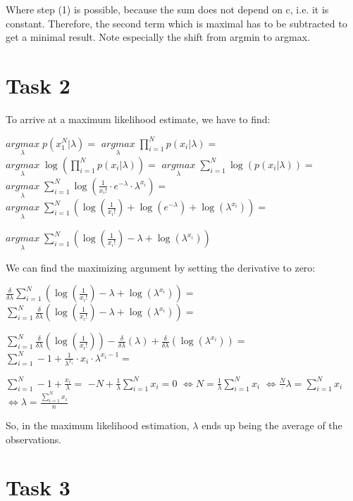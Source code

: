 \documentclass[%
   11pt,              %
   ngerman,           %
   a4paper,           %
   DIV11,             %
]{scrartcl}%
\begin{document}
Where step (1) is possible, because the sum does not depend on c, i.e. it is constant. Therefore, the second term which is maximal has to be subtracted to get a minimal result. Note especially the shift from argmin to argmax.
\
\section*{Task 2}

To arrive at a maximum likelihood estimate, we have to find:

$\underset{\lambda}{arg max}\; p(x_1^N|\lambda) = $
$\underset{\lambda}{arg max}\;  \displaystyle\prod_{i= 1}^N p(x_i|\lambda) = $
$\underset{\lambda}{arg max}\;  \log(\displaystyle\prod_{i= 1}^N p(x_i|\lambda)) = $
$\underset{\lambda}{arg max}\;  \displaystyle\sum_{i= 1}^N \log(p(x_i|\lambda)) = $
$\underset{\lambda}{arg max}\;  \displaystyle\sum_{i= 1}^N \log(\frac{1}{x_i!}\cdot e^{-\lambda}\cdot \lambda^{x_i} ) = $
$\underset{\lambda}{arg max}\;  \displaystyle\sum_{i= 1}^N (\log(\frac{1}{x_i!}) + \log(e^{-\lambda}) + \log(\lambda^{x_i} )) = $

$\underset{\lambda}{arg max}\;  \displaystyle\sum_{i= 1}^N (\log(\frac{1}{x_i!}) - \lambda + \log(\lambda^{x_i} ))$

We can find the maximizing argument by setting the derivative to zero:

$\frac{\delta}{\delta\lambda} \displaystyle\sum_{i= 1}^N (\log(\frac{1}{x_i!}) - \lambda + \log(\lambda^{x_i} )) = $
$\displaystyle\sum_{i= 1}^N \frac{\delta}{\delta\lambda} (\log(\frac{1}{x_i!}) - \lambda + \log(\lambda^{x_i} )) = $

$\displaystyle\sum_{i= 1}^N \frac{\delta}{\delta\lambda} (\log(\frac{1}{x_i!})) - \frac{\delta}{\delta\lambda}(\lambda) + \frac{\delta}{\delta\lambda}(\log(\lambda^{x_i})) = $
$\displaystyle\sum_{i= 1}^N - 1 + \frac{1}{\lambda^{x_i}} \cdot x_i \cdot \lambda^{x_i-1} = $

$\displaystyle\sum_{i= 1}^N - 1 + \frac{x_i}{\lambda} = $
$-N + \frac{1}{\lambda} \displaystyle\sum_{i= 1}^N   x_i= 0$
$\iff N =\frac{1}{\lambda}\displaystyle\sum_{i= 1}^N  x_i$
$\iff \frac{N}\cdot \lambda =\displaystyle\sum_{i= 1}^N  x_i$
$\iff \lambda =\frac{\sum_{i= 1}^N  x_i}{n}$

So, in the maximum likelihood estimation, $\lambda$ ends up being the average of the observations.
\section*{Task 3}
\end{document}
